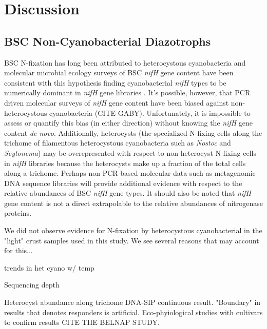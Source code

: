 \section{Discussion}

\subsection{BSC Non-Cyanobacterial Diazotrophs}
BSC N-fixation has long been attributed to heterocystous cyanobacteria and molecular microbial ecology surveys of BSC \textit{nifH} gene content have been consistent with this hypothesis finding cyanobacterial \textit{nifH} types to be numerically dominant in \textit{nifH} gene libraries \cite{Yeager, 14766579, Yeager_2012}. It's possible, however, that PCR driven molecular surveys of \textit{nifH} gene content have been biased against non-heterocystous cyanobacteria (CITE GABY). Unfortunately, it is impossible to assess or quantify this bias (in either direction) without knowing the \textit{nifH} gene content \textit{de novo}. Additionally, heterocysts (the specialized N-fixing cells along the trichome of filamentous heterocystous cyanobacteria such as \textit{Nostoc} and \textit{Scytonema}) may be overepresented with respect to non-heterocyst N-fixing cells in \textit{nifH} libraries because the heterocysts make up a fraction of the total cells along a trichome. Perhaps non-PCR based molecular data such as metagenomic DNA sequence libraries will provide additional evidence with respect to the relative abundances of BSC \textit{nifH} gene types. It should also be noted that \textit{nifH} gene content is not a direct extrapolable to the relative abundances of nitrogenase proteins.

We did not observe evidence for N-fixation by heterocystous cyanobacterial in the "light" crust samples used in this study. We see several reasons that may account for this...

\cite{Yeager_2012} trends in het cyano w/ temp

Sequencing depth

Heterocyst abundance along trichome
DNA-SIP continuous result. "Boundary" in results that denotes responders is artificial. Eco-phyiological studies with cultivars to confirm results CITE THE BELNAP STUDY.

